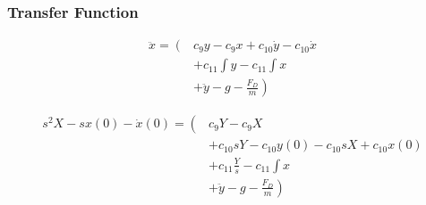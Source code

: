 \subsubsection{Transfer Function}

\begin{align}\nonumber
	\ddot{x} = \left( \right. & c_9 y - c_9 x + c_{10} \dot{y} - c_{10} \dot{x} \\\nonumber
	& + c_{11} \int y - c_{11} \int x \\\nonumber
	& + \left. \ddot{y} - g - \frac{F_D}{m} \right)
\end{align}


\begin{align}\nonumber
	s^2 X - s x(0) - \dot{x}(0) = \left( \right. & c_9 Y - c_9 X \\\nonumber
	& + c_{10} sY - c_{10} y(0) - c_{10} sX + c_{10} x(0) \\\nonumber
	& + c_{11} \frac{Y}{s} - c_{11} \int x \\\nonumber
	& + \left. \ddot{y} - g - \frac{F_D}{m} \right)
\end{align}







